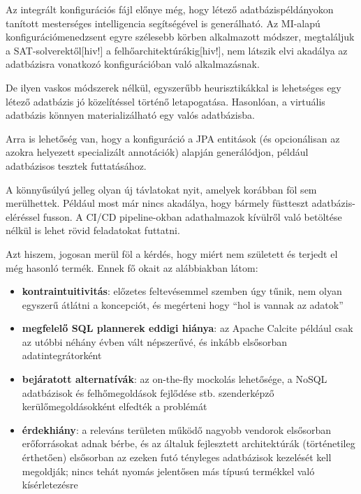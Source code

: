 \documentclass[
    parspace,
    noindent,
    nohyp,
]{elteiktdk}[2023/04/10]
\begin{document}
Az integrált konfigurációs fájl előnye még,
hogy létező adatbázispéldányokon tanított mesterséges intelligencia segítségével is generálható.
Az MI-alapú konfigurációmenedzsent egyre szélesebb körben alkalmazott módszer,
megtaláljuk a SAT-solverektől[hiv!] a felhőarchitektúrákig[hiv!],
nem látszik elvi akadálya az adatbázisra vonatkozó konfigurációban való alkalmazásnak.

De ilyen vaskos módszerek nélkül, egyszerűbb heurisztikákkal is lehetséges
egy létező adatbázis jó közelítéssel történő letapogatása.
Hasonlóan, a virtuális adatbázis könnyen materializálható egy valós adatbázisba.

Arra is lehetőség van, hogy a konfiguráció a JPA entitások
(és opcionálisan az azokra helyezett specializált annotációk)
alapján generálódjon, például adatbázisos tesztek futtatásához.

A könnyűsúlyú jelleg olyan új távlatokat nyit, amelyek korábban föl sem merülhettek.
Például most már nincs akadálya, hogy bármely füstteszt adatbázis-eléréssel fusson.
A CI/CD pipeline-okban adathalmazok kívülről való betöltése nélkül is lehet rövid feladatokat futtatni.

Azt hiszem, jogosan merül föl a kérdés, hogy miért nem született és terjedt el még hasonló termék.
Ennek fő okait az alábbiakban látom:

\begin{itemize}
    \item \textbf{kontraintuitivitás}: előzetes feltevésemmel szemben úgy tűnik,
          nem olyan egyszerű átlátni a koncepciót, és megérteni hogy ``hol is vannak az adatok''
    \item \textbf{megfelelő SQL plannerek eddigi hiánya}: az Apache Calcite például
          csak az utóbbi néhány évben vált népszerűvé, és inkább elsősorban adatintegrátorként
    \item \textbf{bejáratott alternatívák}: az on-the-fly mockolás lehetősége,
          a NoSQL adatbázisok és felhőmegoldások fejlődése stb.
          szenderképző kerülőmegoldásokként elfedték a problémát
    \item \textbf{érdekhiány}: a releváns területen működő nagyobb vendorok elsősorban
          erőforrásokat adnak bérbe, és az általuk fejlesztett architektúrák (történetileg érthetően)
          elsősorban az ezeken futó tényleges adatbázisok kezelését kell megoldják;
          nincs tehát nyomás jelentősen más típusú termékkel való kísérletezésre
\end{itemize}
\end{document}
